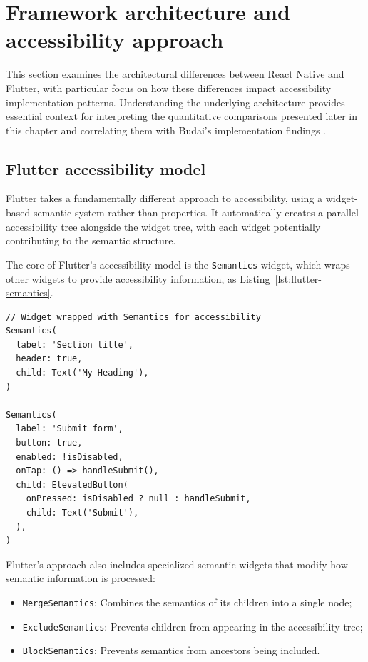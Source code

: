 \section{Framework architecture and accessibility approach}
\label{sec:framework-architecture}

This section examines the architectural differences between React Native and Flutter, with particular focus on how these differences impact accessibility implementation patterns. Understanding the underlying architecture provides essential context for interpreting the quantitative comparisons presented later in this chapter and correlating them with Budai's implementation findings \cite{budai2024mobile}.

\subsection{Flutter accessibility model}
Flutter takes a fundamentally different approach to accessibility, using a widget-based semantic system rather than properties. It automatically creates a parallel accessibility tree alongside the widget tree, with each widget potentially contributing to the semantic structure.

The core of Flutter's accessibility model is the \texttt{Semantics} widget, which wraps other widgets to provide accessibility information, as Listing~\ref{lst:flutter-semantics}.

\begin{lstlisting}[style=DartStyle, caption=Flutter Semantics widget system, label=lst:flutter-semantics]
// Widget wrapped with Semantics for accessibility
Semantics(
  label: 'Section title',
  header: true,
  child: Text('My Heading'),
)

Semantics(
  label: 'Submit form',
  button: true,
  enabled: !isDisabled,
  onTap: () => handleSubmit(),
  child: ElevatedButton(
    onPressed: isDisabled ? null : handleSubmit,
    child: Text('Submit'),
  ),
)
\end{lstlisting}

Flutter's approach also includes specialized semantic widgets that modify how semantic information is processed:

\begin{itemize}
    \item \texttt{MergeSemantics}: Combines the semantics of its children into a single node;
    \item \texttt{ExcludeSemantics}: Prevents children from appearing in the accessibility tree;
    \item \texttt{BlockSemantics}: Prevents semantics from ancestors being included.
\end{itemize}

